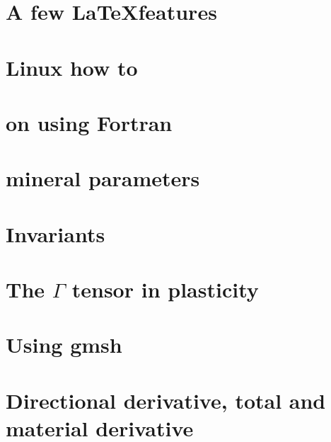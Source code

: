 \documentclass[a4paper,12pt]{report}
\begin{document}
\chapter{A few \LaTeX features}  %
\chapter{Linux how to}  %
\chapter{on using Fortran}  %
\chapter{mineral parameters}  %
\chapter{Invariants \label{app:invariants}}  %
\chapter{The $\Gamma$ tensor in plasticity}  %
\chapter{Using gmsh \label{app:gmsh}}  %
\chapter{Directional derivative, total and material derivative \label{app:ders}}  %

\printbibliography

\newpage
{}
\end{document}
